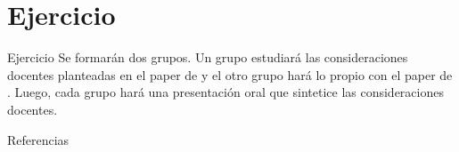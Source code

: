 \documentclass{beamer}
\begin{document}
\section{Ejercicio}
\begin{frame}{Ejercicio}
Se formarán dos grupos. Un grupo estudiará las consideraciones docentes planteadas en el paper de \citeauthor{Morling2020} \citeyear{Morling2020} y el otro grupo hará lo propio con el paper de \citeauthor{Epskamp2019} \citeyear{Epskamp2019}. Luego, cada grupo hará una presentación oral que sintetice las consideraciones docentes.
\end{frame}

\begin{frame}[allowframebreaks]{Referencias}
\tiny

 
\end{frame}
\end{document}
